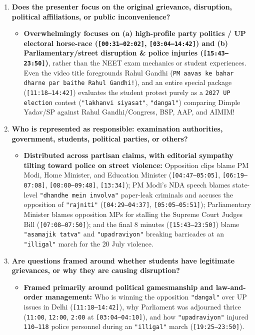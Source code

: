 \documentclass[10pt,a4paper]{article}
\begin{document}
\begin{enumerate}[leftmargin=1.6em, itemsep=4pt, topsep=4pt]
\begin{itemize}[leftmargin=1.4em, itemsep=2pt, topsep=2pt]
  \end{itemize}
  \item \textbf{Does the presenter focus on the original grievance, disruption, political affiliations, or public inconvenience?}
  \begin{itemize}[leftmargin=1.4em, itemsep=2pt, topsep=2pt]
    \item \textbf{Overwhelmingly focuses on (a) high-profile party politics / UP electoral horse-race (\texttt{[00:31--02:02]}, \texttt{[03:04--14:42]}) and (b) Parliamentary/street disruption \& police injuries (\texttt{[15:43--23:50]})}, rather than the NEET exam mechanics or student experiences. Even the video title foregrounds Rahul Gandhi (\texttt{PM aavas ke bahar dharne par baithe Rahul Gandhi!}), and an entire special package (\texttt{[11:18--14:42]}) evaluates the student protest purely as a \texttt{2027 UP election} contest (\texttt{"lakhanvi siyasat"}, \texttt{"dangal"}) comparing Dimple Yadav/SP against Rahul Gandhi/Congress, BSP, AAP, and AIMIM!
  \end{itemize}
  \item \textbf{Who is represented as responsible: examination authorities, government, students, political parties, or others?}
  \begin{itemize}[leftmargin=1.4em, itemsep=2pt, topsep=2pt]
    \item \textbf{Distributed across partisan claims, with editorial sympathy tilting toward police on street violence:} Opposition clips blame PM Modi, Home Minister, and Education Minister (\texttt{[04:47--05:05]}, \texttt{[06:19--07:08]}, \texttt{[08:00--09:48]}, \texttt{[13:34]}); PM Modi's NDA speech blames state-level \texttt{"dhandhe mein involva"} paper-leak criminals and accuses the opposition of \texttt{"rajniti"} (\texttt{[04:29--04:37]}, \texttt{[05:05--05:51]}); Parliamentary Minister blames opposition MPs for stalling the Supreme Court Judges Bill (\texttt{[07:08--07:50]}); and the final 8 minutes (\texttt{[15:43--23:50]}) blame \texttt{"asamajik tatva"} and \texttt{"upadraviyon"} breaking barricades at an \texttt{"illigal"} march for the 20 July violence.
  \end{itemize}
  \item \textbf{Are questions framed around whether students have legitimate grievances, or why they are causing disruption?}
  \begin{itemize}[leftmargin=1.4em, itemsep=2pt, topsep=2pt]
    \item \textbf{Framed primarily around political gamesmanship and law-and-order management:} Who is winning the opposition \texttt{"dangal"} over UP issues in Delhi (\texttt{[11:18--14:42]}), why Parliament was adjourned thrice (\texttt{11:00}, \texttt{12:00}, \texttt{2:00} at \texttt{[03:04--04:10]}), and how \texttt{"upadraviyon"} injured \texttt{110--118} police personnel during an \texttt{"illigal"} march (\texttt{[19:25--23:50]}).

\end{itemize}
\end{enumerate}
\end{document}
